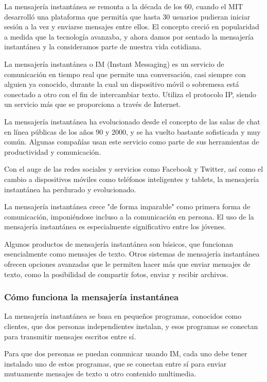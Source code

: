 La mensajería instantánea se remonta a la década de los 60, cuando el MIT desarrolló una plataforma que permitía que hasta 30 usuarios pudieran iniciar sesión a la vez y enviarse mensajes entre ellos. El concepto creció en popularidad a medida que la tecnología avanzaba, y ahora damos por sentado la mensajería instantánea y la consideramos parte de nuestra vida cotidiana.

La mensajería instantánea o IM (Instant Messaging) es un servicio de comunicación en tiempo real que permite una conversación, casi siempre con alguien ya conocido, durante la cual un dispositivo móvil o sobremesa está conectado a otro con el fin de intercambiar texto. Utiliza el protocolo IP, siendo un servicio más que se proporciona a través de Internet.

La mensajería instantánea ha evolucionado desde el concepto de las salas de chat en línea públicas de los años 90 y 2000, y se ha vuelto bastante sofisticada y muy común. Algunas compañías usan este servicio como parte de sus herramientas de productividad y comunicación.

Con el auge de las redes sociales y servicios como Facebook y Twitter, así como el cambio a dispositivos móviles como teléfonos inteligentes y tablets, la mensajería instantánea ha perdurado y evolucionado.

La mensajería instantánea crece "de forma imparable" como primera forma de comunicación, imponiéndose incluso a la comunicación en persona. El uso de la mensajería instantánea es especialmente significativo entre los jóvenes.

Algunos productos de mensajería instantánea son básicos, que funcionan esencialmente como mensajes de texto. Otros sistemas de mensajería instantánea ofrecen opciones avanzadas que le permiten hacer más que enviar mensajes de texto, como la posibilidad de compartir fotos, enviar y recibir archivos.

\subsubsection{Cómo funciona la mensajería instantánea}

La mensajería instantánea se basa en pequeños programas, conocidos como clientes, que dos personas independientes instalan, y esos programas se conectan para transmitir mensajes escritos entre sí.

Para que dos personas se puedan comunicar usando IM, cada uno debe tener instalado uno de estos programas, que se conectan entre sí para enviar mutuamente mensajes de texto u otro contenido multimedia.

